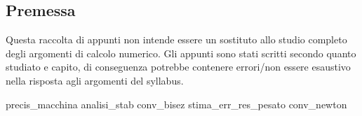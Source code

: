 \documentclass[12pt,a4paper,headings=optiontohead]{article}
\begin{document}
\begin{center}
\pagebreak

\section*{Premessa}
\begin{minipage}{0.9\textwidth} \large

Questa raccolta di appunti non intende essere un sostituto allo studio completo degli argomenti di calcolo numerico. Gli appunti sono stati scritti secondo quanto studiato e capito, di conseguenza potrebbe contenere errori/non essere esaustivo nella risposta agli argomenti del syllabus.

\end{minipage}

\end{center}
\pagebreak


\tableofcontents

\newpage
{precis_macchina}
\newpage
{analisi_stab}
{conv_bisez}
\newpage
{stima_err_res_pesato}
\newpage
{conv_newton}
\end{document}
